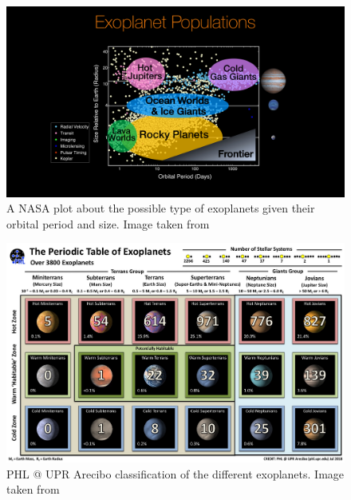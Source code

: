 \documentclass[
12pt, %
a4paper, %
oneside, %
headinclude,footinclude, %
BCOR5mm, %
]{scrartcl}
\begin{document}
\begin{figure}[h]
\begin{center}
\includegraphics[width=1\textwidth]{Pic/press-web25_exoplanet_populations.jpg}
\caption{A NASA plot about the possible type of exoplanets given their orbital period and size. Image taken from \cite{exoplanet_populations}}
\label{exoplanet_populations}
\end{center}
\end{figure}

\begin{figure}[h]
\begin{center}
\includegraphics[width=1\textwidth]{Pic/PT_Confirmed.jpg}
\caption{PHL @ UPR Arecibo classification of the different exoplanets. Image taken from \cite{exoplanets-catalog}}
\label{PT_Confirmed}
\end{center}
\end{figure}
\end{document}
